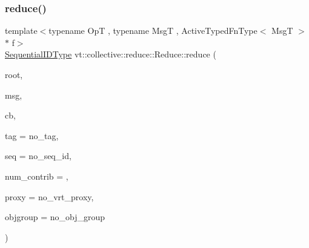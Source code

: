 \subsubsection{\texorpdfstring{reduce()}{reduce()}\hspace{0.1cm}{\footnotesize\ttfamily [2/3]}}
{\footnotesize\ttfamily template$<$typename OpT , typename MsgT , Active\+Typed\+Fn\+Type$<$ Msg\+T $>$ $\ast$ f$>$ \\
\hyperlink{namespacevt_a3063d4db3b879d6dd2c7b8d50995c7f6}{Sequential\+I\+D\+Type} vt\+::collective\+::reduce\+::\+Reduce\+::reduce (\begin{DoxyParamCaption}\item[{\hyperlink{namespacevt_a866da9d0efc19c0a1ce79e9e492f47e2}{Node\+Type} const \&}]{root,  }\item[{MsgT $\ast$}]{msg,  }\item[{\hyperlink{namespacevt_a36db99df4c973d48b1118a293fff533f}{Callback}$<$ MsgT $>$}]{cb,  }\item[{\hyperlink{namespacevt_a84ab281dae04a52a4b243d6bf62d0e52}{Tag\+Type} const \&}]{tag = {\ttfamily no\+\_\+tag},  }\item[{\hyperlink{namespacevt_a3063d4db3b879d6dd2c7b8d50995c7f6}{Sequential\+I\+D\+Type} const \&}]{seq = {\ttfamily no\+\_\+seq\+\_\+id},  }\item[{\hyperlink{structvt_1_1collective_1_1reduce_1_1_reduce_a6fd4d5e956ac5acd321e57c7dad5131f}{Reduce\+Num\+Type} const \&}]{num\+\_\+contrib = {},  }\item[{\hyperlink{namespacevt_a1b417dd5d684f045bb58a0ede70045ac}{Virtual\+Proxy\+Type} const \&}]{proxy = {\ttfamily no\+\_\+vrt\+\_\+proxy},  }\item[{\hyperlink{namespacevt_ad7cae989df485fccca57f0792a880a8e}{Obj\+Group\+Proxy\+Type}}]{objgroup = {\ttfamily no\+\_\+obj\+\_\+group} }\end{DoxyParamCaption})}

\mbox{\label{structvt_1_1collective_1_1reduce_1_1_reduce_a526a8c10de0a179deca4f1a6961ec636}} 
